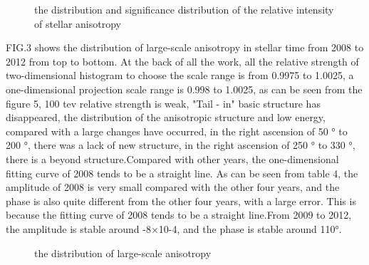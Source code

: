 \documentclass{aastex62}
\begin{document}
\begin{figure}
\caption{the distribution and significance distribution of the relative intensity of stellar anisotropy\label{fig:f2}}
\end{figure}

FIG.3 shows the distribution of large-scale anisotropy in stellar time from 2008 to 2012 from top to bottom. At the back of all the work, all the relative strength of two-dimensional histogram to choose the scale range is from 0.9975 to 1.0025, a one-dimensional projection scale range is 0.998 to 1.0025, as can be seen from the figure 5, 100 tev relative strength is weak, "Tail - in" basic structure has disappeared, the distribution of the anisotropic structure and low energy, compared with a large changes have occurred, in the right ascension of 50 ° to 200 °, there was a lack of new structure, in the right ascension of 250 ° to 330 °, there is a beyond structure.Compared with other years, the one-dimensional fitting curve of 2008 tends to be a straight line. As can be seen from table 4, the amplitude of 2008 is very small compared with the other four years, and the phase is also quite different from the other four years, with a large error. This is because the fitting curve of 2008 tends to be a straight line.From 2009 to 2012, the amplitude is stable around -8×10-4, and the phase is stable around 110°.

\begin{figure}
\caption{the distribution of large-scale  anisotropy\label{fig:f2}}
\end{figure}
\end{document}
